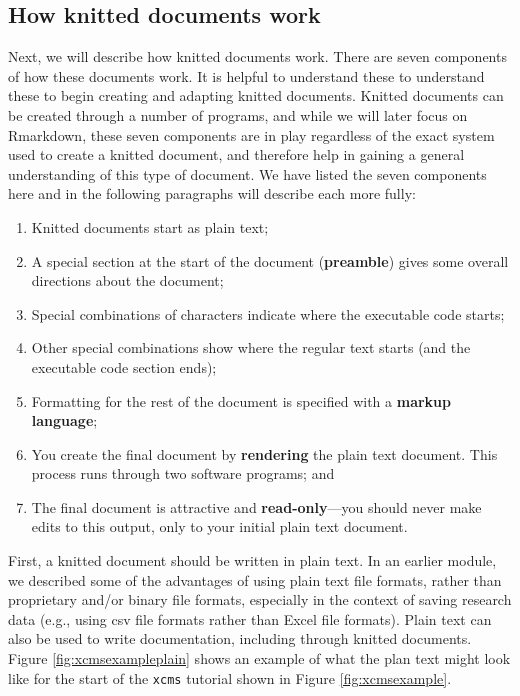 \documentclass[]{tufte-book}
\providecommand{\tightlist}{%
  \setlength{\itemsep}{0pt}\setlength{\parskip}{0pt}}
\begin{document}
\hypertarget{how-knitted-documents-work}{%
\subsection{How knitted documents work}\label{how-knitted-documents-work}}

Next, we will describe how knitted documents work. There are seven components of
how these documents work. It is helpful to understand these to understand these
to begin creating and adapting knitted documents. Knitted documents can be
created through a number of programs, and while we will later focus on
Rmarkdown, these seven components are in play regardless of the exact system
used to create a knitted document, and therefore help in gaining a general
understanding of this type of document. We have listed the seven components here
and in the following paragraphs will describe each more fully:

\begin{enumerate}
\def\labelenumi{\arabic{enumi}.}
\tightlist
\item
  Knitted documents start as plain text;
\item
  A special section at the start of the document (\textbf{preamble}) gives some
  overall directions about the document;
\item
  Special combinations of characters indicate where the executable code starts;
\item
  Other special combinations show where the regular text starts (and the
  executable code section ends);
\item
  Formatting for the rest of the document is specified with a \textbf{markup
  language};
\item
  You create the final document by \textbf{rendering} the plain text document. This
  process runs through two software programs; and
\item
  The final document is attractive and \textbf{read-only}---you should never make
  edits to this output, only to your initial plain text document.
\end{enumerate}

First, a knitted document should be written in plain text. In an earlier module,
we described some of the advantages of using plain text file formats, rather
than proprietary and/or binary file formats, especially in the context of saving
research data (e.g., using csv file formats rather than Excel file formats).
Plain text can also be used to write documentation, including through knitted
documents. Figure \ref{fig:xcmsexampleplain} shows an example of what the plan text might look like for the
start of the \texttt{xcms} tutorial shown in Figure \ref{fig:xcmsexample}.
\end{document}
